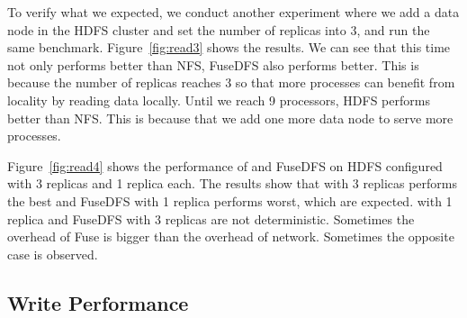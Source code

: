 To verify what we expected, we conduct another experiment where we add a data
node in the HDFS cluster and set the
number of replicas into 3, and run the same benchmark. Figure~\ref{fig:read3}
shows the results. We can see that this time not only {\proj} performs better
than NFS, FuseDFS also performs better. This is because the number of replicas
reaches 3 so that more processes can benefit from locality by reading data
locally. Until we reach 9 processors, HDFS
performs better than NFS. This is because that we add one more data node to
serve more processes.


Figure~\ref{fig:read4} shows the performance of {\proj} and FuseDFS on HDFS
configured with 3 replicas and 1 replica each. The results show that {\proj}
with 3 replicas performs the best and FuseDFS with 1 replica performs worst,
which are expected. {\proj} with 1 replica and FuseDFS with 3 replicas are not
deterministic. Sometimes the overhead of Fuse is bigger than the overhead of
network. Sometimes the opposite case is observed. 

\subsection{Write Performance}
